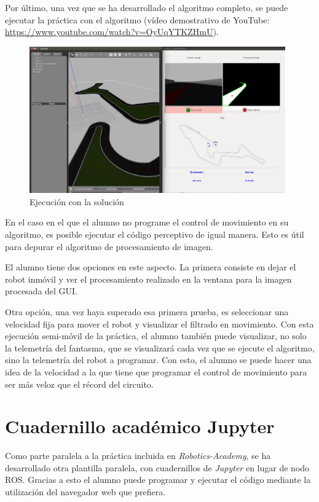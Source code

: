 Por último, una vez que se ha desarrollado el algoritmo completo, se puede ejecutar la práctica con el algoritmo (vídeo demostrativo de YouTube: \url{https://www.youtube.com/watch?v=OyUqYTKZHmU}).

\begin{figure}[H]
  \begin{center}
    \includegraphics[width=0.98\textwidth]{figures/ejec_algoritmo_ch.png}
		\caption{Ejecución con la solución}
		\label{fig.ealgch}
		\end{center}
\end{figure}

En el caso en el que el alumno no programe el control de movimiento en su algoritmo, es posible ejecutar el código perceptivo de igual manera. Esto es útil para depurar el algoritmo de procesamiento de imagen. 

El alumno tiene dos opciones en este aspecto. La primera consiste en dejar el robot inmóvil y ver el procesamiento realizado en la ventana para la imagen procesada del GUI. 

Otra opción, una vez haya superado esa primera prueba, es seleccionar una velocidad fija para mover el robot y visualizar el filtrado en movimiento.
Con esta ejecución semi-móvil de la práctica, el alumno también puede visualizar, no solo la telemetría del fantasma, que se visualizará cada vez que se ejecute el algoritmo, sino la telemetría del robot a programar. Con esto, el alumno se puede hacer una idea de la velocidad a la que tiene que programar el control de movimiento para ser más veloz que el récord del circuito.

\section{Cuadernillo académico Jupyter}
Como parte paralela a la práctica incluida en \textit{Robotics-Academy}, se ha desarrollado otra plantilla paralela, con cuadernillos de \textit{Jupyter} en lugar de nodo ROS. Gracias a esto el alumno puede programar y ejecutar el código mediante la utilización del navegador web que prefiera.

